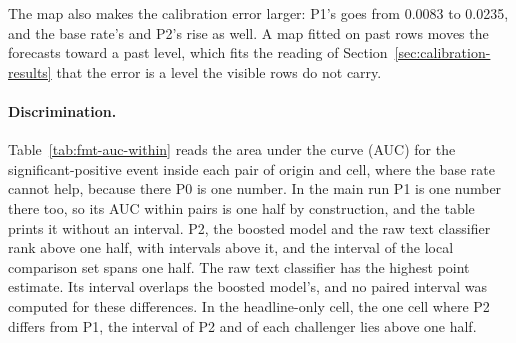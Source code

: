 The map also makes the calibration error larger: P1's goes from 0.0083 to 0.0235, and the base rate's and P2's rise as well. A map fitted on past rows moves the forecasts toward a past level, which fits the reading of Section~\ref{sec:calibration-results} that the error is a level the visible rows do not carry.

\paragraph{Discrimination.}
Table~\ref{tab:fmt-auc-within} reads the area under the curve (AUC) for the significant-positive event inside each pair of origin and cell, where the base rate cannot help, because there P0 is one number. In the main run P1 is one number there too, so its AUC within pairs is one half by construction, and the table prints it without an interval. P2, the boosted model and the raw text classifier rank above one half, with intervals above it, and the interval of the local comparison set spans one half. The raw text classifier has the highest point estimate. Its interval overlaps the boosted model's, and no paired interval was computed for these differences. In the headline-only cell, the one cell where P2 differs from P1, the interval of P2 and of each challenger lies above one half.

\begin{table}[t]\centering\scriptsize
\caption{Event AUC within pairs of origin and cell on the headline archive: over all cells, and in the headline-only cell, within its origins (Table~\ref{tab:discrimination-within}, Appendix~\ref{app:tables}). Since P0 is one number per pair, it sits at one half and has no interval. In the main run P1 is one number per pair too, so it sits at one half as well.}
\label{tab:fmt-auc-within}

\end{table}

